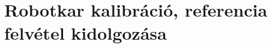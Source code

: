 \documentclass[../documentation.tex]{subfiles}
\begin{document}
\section{Robotkar kalibráció, referencia felvétel kidolgozása}
\end{document}
